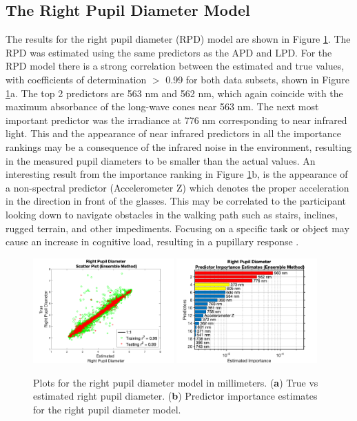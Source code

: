 \documentclass[10pt]{article}
\begin{document}
\subsection{The Right Pupil Diameter Model}

The results for the right pupil diameter (RPD) model are shown in Figure \ref{fig:RPD}. The RPD was estimated using the same predictors as the APD and LPD. For the RPD model there is a strong correlation between the estimated and true values, with coefficients of determination $>$ 0.99 for both data subsets, shown in Figure \ref{fig:RPD}a. The top 2 predictors are 563 nm and 562 nm, which again coincide with the maximum absorbance of the long-wave cones near 563 nm. The next most important predictor was the irradiance at 776 nm corresponding to near infrared light. This and the appearance of near infrared predictors in all the importance rankings may be a consequence of the infrared noise in the environment, resulting in the measured pupil diameters to be smaller than the actual values. An interesting result from the importance ranking in Figure \ref{fig:RPD}b, is the appearance of a non-spectral predictor (Accelerometer Z) which denotes the proper acceleration in the direction in front of the glasses. This may be correlated to the participant looking down to navigate obstacles in the walking path such as stairs, inclines, rugged terrain, and other impediments. Focusing on a specific task or object may cause an increase in cognitive load, resulting in a pupillary response \cite{PupilLoad3,PupilLoad4}.

\begin{figure}[!t]
  \centering
  \includegraphics[width=0.48\textwidth]{./scatterPlots/RightPupilDiameter_Ensemble_Scatter2.png}\label{fig:RPDa}
  \hfill
  \includegraphics[width=0.48\textwidth]{./importanceRankings/RightPupilDiameterEnsembleImpRankT20.png}\label{fig:RPDb}
  \caption{Plots for the right pupil diameter model in millimeters. (\textbf{a}) True vs estimated right pupil diameter. (\textbf{b}) Predictor importance estimates for the right pupil diameter model.
  }
  \label{fig:RPD}
\end{figure}
\end{document}
